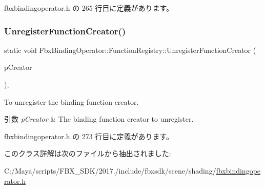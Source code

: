  fbxbindingoperator.\+h の 265 行目に定義があります。

\mbox{\label{class_fbx_binding_operator_1_1_function_registry_a8395c776992e40df9639032984dcc094}} 
\subsubsection{\texorpdfstring{Unregister\+Function\+Creator()}{UnregisterFunctionCreator()}}
{\footnotesize\ttfamily static void Fbx\+Binding\+Operator\+::\+Function\+Registry\+::\+Unregister\+Function\+Creator (\begin{DoxyParamCaption}\item[{\hyperlink{class_fbx_binding_operator_1_1_function_creator_base}{Function\+Creator\+Base} const \&}]{p\+Creator }\end{DoxyParamCaption})\hspace{0.3cm}{\ttfamily [inline]}, {\ttfamily [static]}}

To unregister the binding function creator. 
\begin{DoxyParams}{引数}
{\em p\+Creator} & The binding function creator to unregister. \\
\hline
\end{DoxyParams}


 fbxbindingoperator.\+h の 273 行目に定義があります。



このクラス詳解は次のファイルから抽出されました\+:\begin{DoxyCompactItemize}
\item 
C\+:/\+Maya/scripts/\+F\+B\+X\+\_\+\+S\+D\+K/2017./include/fbxsdk/scene/shading/\hyperlink{fbxbindingoperator_8h}{fbxbindingoperator.\+h}\end{DoxyCompactItemize}
